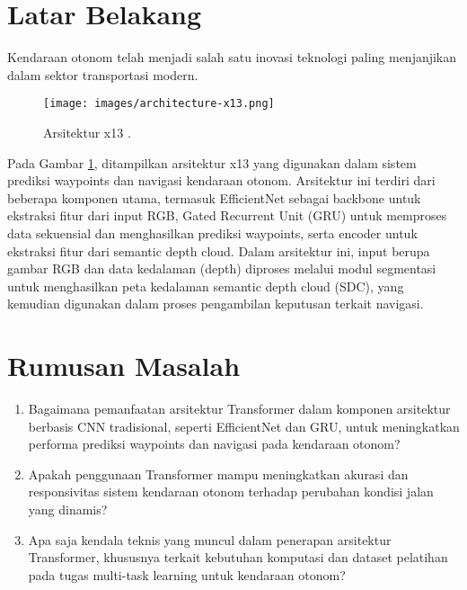\setcounter{chapter}{1}

\renewcommand{\thesection}{\thechapter.\arabic{section}}
\section{Latar Belakang}

Kendaraan otonom telah menjadi salah satu inovasi teknologi paling menjanjikan dalam sektor transportasi modern. 

\begin{figure}[H]
    \centering
    \texttt{[image: images/architecture-x13.png]}
    \caption{Arsitektur x13 \parencite{Natan2023-hi}.}
    \label{fig:architecture_x13}
\end{figure}

Pada Gambar \ref{fig:architecture_x13}, ditampilkan arsitektur x13 yang digunakan dalam sistem prediksi waypoints dan navigasi kendaraan otonom. Arsitektur ini terdiri dari beberapa komponen utama, termasuk EfficientNet sebagai backbone untuk ekstraksi fitur dari input RGB, Gated Recurrent Unit (GRU) untuk memproses data sekuensial dan menghasilkan prediksi waypoints, serta encoder untuk ekstraksi fitur dari semantic depth cloud. Dalam arsitektur ini, input berupa gambar RGB dan data kedalaman (depth) diproses melalui modul segmentasi untuk menghasilkan peta kedalaman semantic depth cloud (SDC), yang kemudian digunakan dalam proses pengambilan keputusan terkait navigasi.

\section{Rumusan Masalah}
\begin{enumerate}
    \item Bagaimana pemanfaatan arsitektur Transformer dalam komponen arsitektur berbasis CNN tradisional, seperti EfficientNet dan GRU, untuk meningkatkan performa prediksi waypoints dan navigasi pada kendaraan otonom?
    \item Apakah penggunaan Transformer mampu meningkatkan akurasi dan responsivitas sistem kendaraan otonom terhadap perubahan kondisi jalan yang dinamis?
    \item Apa saja kendala teknis yang muncul dalam penerapan arsitektur Transformer, khususnya terkait kebutuhan komputasi dan dataset pelatihan pada tugas multi-task learning untuk kendaraan otonom?
\end{enumerate}

